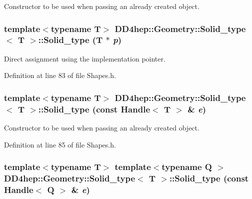 Constructor to be used when passing an already created object. \hypertarget{class_d_d4hep_1_1_geometry_1_1_solid__type_a2788d7317836c7fa98581c4b78d871a7}{
\subsubsection[{Solid\_\-type}]{\setlength{\rightskip}{0pt plus 5cm}template$<$typename T$>$ {\bf DD4hep::Geometry::Solid\_\-type}$<$ {\bf T} $>$::{\bf Solid\_\-type} ({\bf T} $\ast$ {\em p})}}
\label{class_d_d4hep_1_1_geometry_1_1_solid__type_a2788d7317836c7fa98581c4b78d871a7}


Direct assignment using the implementation pointer. 

Definition at line 83 of file Shapes.h.\hypertarget{class_d_d4hep_1_1_geometry_1_1_solid__type_a153b1496923f3a094a13bfb57e73a81e}{
\subsubsection[{Solid\_\-type}]{\setlength{\rightskip}{0pt plus 5cm}template$<$typename T$>$ {\bf DD4hep::Geometry::Solid\_\-type}$<$ {\bf T} $>$::{\bf Solid\_\-type} (const {\bf Handle}$<$ {\bf T} $>$ \& {\em e})}}
\label{class_d_d4hep_1_1_geometry_1_1_solid__type_a153b1496923f3a094a13bfb57e73a81e}


Constructor to be used when passing an already created object. 

Definition at line 85 of file Shapes.h.\hypertarget{class_d_d4hep_1_1_geometry_1_1_solid__type_a618f7b1dd4b603b1c619918629d8ba98}{
\subsubsection[{Solid\_\-type}]{\setlength{\rightskip}{0pt plus 5cm}template$<$typename T$>$ template$<$typename Q $>$ {\bf DD4hep::Geometry::Solid\_\-type}$<$ {\bf T} $>$::{\bf Solid\_\-type} (const {\bf Handle}$<$ Q $>$ \& {\em e})}}
\label{class_d_d4hep_1_1_geometry_1_1_solid__type_a618f7b1dd4b603b1c619918629d8ba98}



